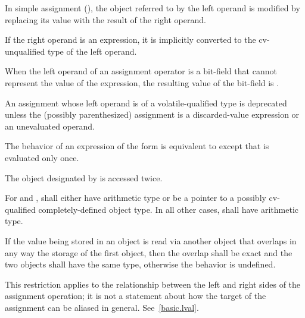 \pnum
In simple assignment (\tcode{=}), the object referred to by the left operand
is modified
by replacing its value with the result of the right operand.

\pnum
{}%
If the right operand is an expression, it is implicitly
converted to the cv-unqualified type of the left
operand.

\pnum
{}%
When the left operand of an assignment operator
is a bit-field that cannot represent the value of the expression, the
resulting value of the bit-field is
.

\pnum
An assignment whose left operand is of
a volatile-qualified type is deprecated
unless the (possibly parenthesized) assignment is a discarded-value expression or
an unevaluated operand.

\pnum
The behavior of an expression of the form 
is equivalent to  except
that  is evaluated only once.
\begin{note}
The object designated by  is accessed twice.
\end{note}
For \tcode{+=} and \tcode{-=},
 shall either have arithmetic type or be a pointer to a
possibly cv-qualified completely-defined object type. In all other
cases,  shall have arithmetic type.

\pnum
If the value being stored in an object is read via another object that
overlaps in any way the storage of the first object, then the overlap shall be
exact and the two objects shall have the same type, otherwise the behavior is
undefined.
\begin{note}
This restriction applies to the relationship
between the left and right sides of the assignment operation; it is not a
statement about how the target of the assignment can be aliased in general.
See~\ref{basic.lval}.
\end{note}

